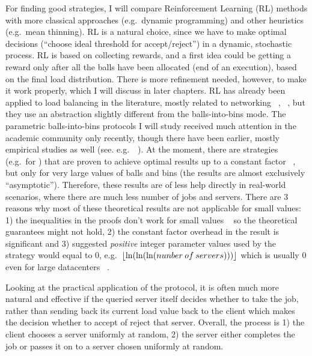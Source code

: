 For finding good strategies, I will compare Reinforcement Learning (RL) methods with more classical approaches (e.g.\ dynamic programming) and other heuristics (e.g.\ mean thinning). RL is a natural choice, since we have to make optimal decisions (``choose ideal threshold for accept/reject'') in a dynamic, stochastic process. RL is based on collecting rewards, and a first idea could be getting a reward only after all the balls have been allocated (end of an execution), based on the final load distribution. There is more refinement needed, however, to make it work properly, which I will discuss in later chapters. RL has already been applied to load balancing in the literature, mostly related to networking ~\cite{attiah2020RLcellular}, ~\cite{yeo2021controller}, but they use an abstraction slightly different from the balls-into-bins mode. The parametric balls-into-bins protocols I will study received much attention in the academic community only recently, though there have been earlier, mostly empirical studies as well (see. e.g.\ ~\cite{derek1986twothinningfirstattempt}). At the moment, there are strategies (e.g.\ for \TwoThinning) that are proven to achieve optimal results up to a constant factor ~\cite{feldheim2021thinning}, but only for very large values of balls and bins (the results are almost exclusively ``asymptotic''). Therefore, these results are of less help directly in real-world scenarios, where there are much less number of jobs and servers. There are $3$ reasons why most of these theoretical results are not applicable for small values: 1) the inequalities in the proofs don't work for small values ~\cite{feldheim2021longtermthinning} so the theoretical guarantees might not hold, 2) the constant factor overhead in the result is significant and 3) suggested \textit{positive} integer parameter values used by the strategy would equal to $0$, e.g.\ $\lfloor\ln(\ln(\ln(nunber\: of \: servers)))\rfloor$ which is usually $0$ even for large datacenters ~\cite{uzaman2019datacentersize}.



Looking at the practical application of the \TwoThinning protocol, it is often much more natural and effective if the queried server itself decides whether to take the job, rather than sending back its current load value back to the client which makes the decision whether to accept of reject that server.  Overall, the process is 1) the client chooses a server uniformly at random, 2) the server either completes the job or passes it on to a server chosen uniformly at random.

